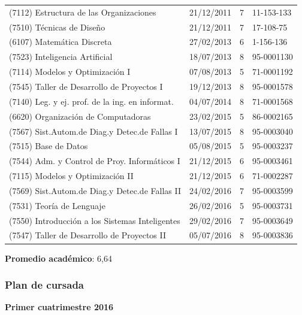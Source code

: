 \documentclass[a4paper,11pt]{article}
\begin{document}
\begin{longtable}{|l|l|r|l|}
  (7112) Estructura de las Organizaciones           & 21/12/2011 & 7  & 11-153-133        \\
  (7510) Técnicas de Diseño                         & 21/12/2011 & 7  & 17-108-75         \\
  (6107) Matemática Discreta                        & 27/02/2013 & 6  & 1-156-136         \\
  (7523) Inteligencia Artificial                    & 18/07/2013 & 8  & 95-0001130        \\
  (7114) Modelos y Optimización I                   & 07/08/2013 & 5  & 71-0001192        \\
  (7545) Taller de Desarrollo de Proyectos I        & 19/12/2013 & 8  & 95-0001578        \\
  (7140) Leg. y ej. prof. de la ing. en informat.   & 04/07/2014 & 8  & 71-0001568        \\
  (6620) Organización de Computadoras               & 23/02/2015 & 5  & 86-0002165        \\
  (7567) Sist.Autom.de Diag.y Detec.de Fallas I     & 13/07/2015 & 8  & 95-0003040        \\
  (7515) Base de Datos                              & 05/08/2015 & 5  & 95-0003237        \\
  (7544) Adm. y Control de Proy. Informáticos I     & 21/12/2015 & 6  & 95-0003461        \\
  (7115) Modelos y Optimización II                  & 21/12/2015 & 6  & 71-0002287        \\
  (7569) Sist.Autom.de Diag.y Detec.de Fallas II    & 24/02/2016 & 7  & 95-0003599        \\
  (7531) Teoría de Lenguaje                         & 26/02/2016 & 5  & 95-0003731        \\
  (7550) Introducción a los Sistemas Inteligentes   & 29/02/2016 & 7  & 95-0003649        \\
  (7547) Taller de Desarrollo de Proyectos II       & 05/07/2016 & 8  & 95-0003836        \\

\end{longtable}

\textbf{Promedio académico}: 6,64

\subsubsection{Plan de cursada}

\textbf{Primer cuatrimestre 2016}
\end{document}
